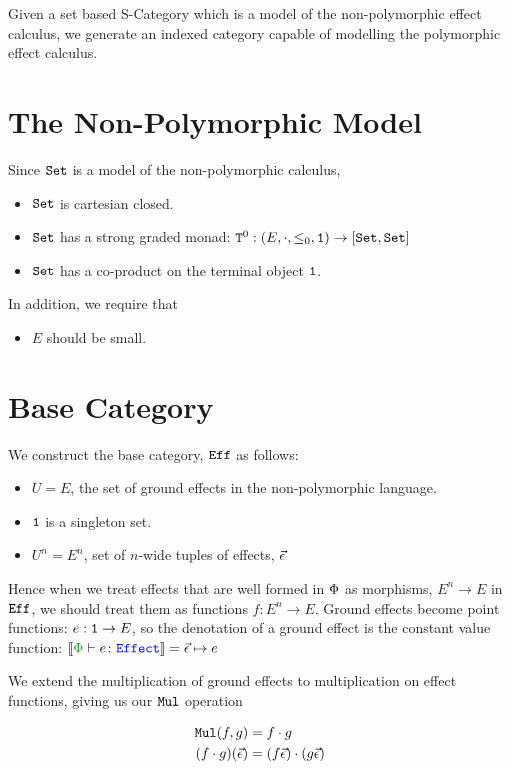 \documentclass{report}
\begin{document}
    

Given a set based S-Category which is a model of the non-polymorphic effect calculus, we generate an indexed category capable of modelling the polymorphic effect calculus.
\section{The Non-Polymorphic Model}
Since $\set$ is a model of the non-polymorphic calculus,
\begin{itemize}
    \item $\set$ is cartesian closed.
    \item $\set$ has a strong graded monad: $\Tz{}{}: (E, \dot, \subeffect_0, \1) \rightarrow [\set, \set]$
    \item $\set$ has a co-product on the terminal object $\1$.
\end{itemize}

In addition, we require that 
\begin{itemize}
    \item $E$ should be small.
\end{itemize}


\section{Base Category}

We construct the base category, $\Eff$ as follows:

\begin{itemize}
    \item $U = E$, the set of ground effects in the non-polymorphic language.
    \item $\1$ is a singleton set.
    \item $U^n = E^n$, set of $n$-wide tuples of effects, $\vec{\e}$
\end{itemize}

Hence when we treat effects that are well formed in $\P$ as morphisms, $E^n \rightarrow E$ in $\Eff$, we should treat them as functions $f: E^n \rightarrow E$. Ground effects become point functions: $e: \1 \rightarrow E$, so the denotation of a ground effect is the constant value function: $\deno{\typerelation{\P}{e}{\effect}} = \ev \mapsto e$

We extend the multiplication of ground effects to multiplication on effect functions, giving us our $\Mul$ operation

\begin{align}
    \Mul(f, g) & = f\dot g\\
    (f\dot g)(\ev) & = (f\ev)\dot(g\ev)\\
\end{align}
\end{document}
